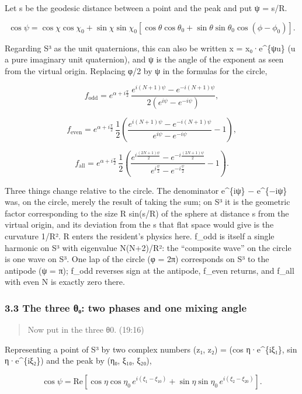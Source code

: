\documentclass[
  a4paper,
]{article}
\begin{document}
Let s be the geodesic distance between a point and the peak and put ψ =
s/R.

\[
\cos\psi=\cos\chi\cos\chi_0+\sin\chi\sin\chi_0\left[\cos\theta\cos\theta_0+\sin\theta\sin\theta_0\cos(\phi-\phi_0)\right].
\]

Regarding S³ as the unit quaternions, this can also be written x =
x₀·e\^{}\{ψu\} (u a pure imaginary unit quaternion), and ψ is the angle
of the exponent as seen from the virtual origin. Replacing φ/2 by ψ in
the formulas for the circle,

\[
f_{\mathrm{odd}}=e^{\alpha+i\frac{\pi}{2}}\,\frac{e^{i(N+1)\psi}-e^{-i(N+1)\psi}}{2\left(e^{i\psi}-e^{-i\psi}\right)},
\]

\[
f_{\mathrm{even}}=e^{\alpha+i\frac{\pi}{2}}\,\frac{1}{2}\left(\frac{e^{i(N+1)\psi}-e^{-i(N+1)\psi}}{e^{i\psi}-e^{-i\psi}}-1\right),
\]

\[
f_{\mathrm{all}}=e^{\alpha+i\frac{\pi}{2}}\,\frac{1}{2}\left(\frac{e^{i\frac{(2N+1)\psi}{2}}-e^{-i\frac{(2N+1)\psi}{2}}}{e^{i\frac{\psi}{2}}-e^{-i\frac{\psi}{2}}}-1\right).
\]

Three things change relative to the circle. The denominator e\^{}\{iψ\}
− e\^{}\{−iψ\} was, on the circle, merely the result of taking the sum;
on S³ it is the geometric factor corresponding to the size R sin(s/R) of
the sphere at distance s from the virtual origin, and its deviation from
the s that flat space would give is the curvature 1/R². R enters the
resident's physics here. f\_odd is itself a single harmonic on S³ with
eigenvalue N(N+2)/R²: the ``composite wave'' on the circle is one wave
on S³. One lap of the circle (φ = 2π) corresponds on S³ to the antipode
(ψ = π); f\_odd reverses sign at the antipode, f\_even returns, and
f\_all with even N is exactly zero there.

\subsubsection{3.3 The three θ₀: two phases and one mixing
angle}\label{the-three-ux3b8ux2080-two-phases-and-one-mixing-angle}

\begin{quote}
Now put in the three θ0. (19:16)
\end{quote}

Representing a point of S³ by two complex numbers (z₁, z₂) = (cos
η·e\^{}\{iξ₁\}, sin η·e\^{}\{iξ₂\}) and the peak by (η₀, ξ₁₀, ξ₂₀),

\[
\cos\psi=\mathrm{Re}\left[\cos\eta\cos\eta_0\,e^{i(\xi_1-\xi_{10})}+\sin\eta\sin\eta_0\,e^{i(\xi_2-\xi_{20})}\right].
\]
\end{document}
